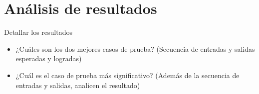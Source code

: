 \section{Análisis de resultados}

\begin{tcolorbox}[colback=yellow!10!white,colframe=red!75!black,title=Recomendaciones]
Detallar los resultados
  \begin{itemize}
      \item ¿Cuáles son los dos mejores casos de prueba? (Secuencia de entradas y salidas esperadas y logradas)
      \item ¿Cuál es el caso de prueba más significativo? (Además de la secuencia de entradas y salidas, analicen el resultado)
  \end{itemize}
\end{tcolorbox}

\pagebreak